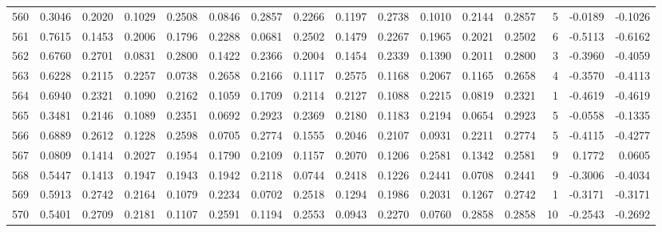 \begin{tabular}{lrrrrrrrrrrrrrrr}
560 &      0.3046 &  0.2020 &  0.1029 &  0.2508 &  0.0846 &  0.2857 &  0.2266 &  0.1197 &  0.2738 &  0.1010 &   0.2144 &     0.2857 &      5 &                   -0.0189 &                    -0.1026 \\
561 &      0.7615 &  0.1453 &  0.2006 &  0.1796 &  0.2288 &  0.0681 &  0.2502 &  0.1479 &  0.2267 &  0.1965 &   0.2021 &     0.2502 &      6 &                   -0.5113 &                    -0.6162 \\
562 &      0.6760 &  0.2701 &  0.0831 &  0.2800 &  0.1422 &  0.2366 &  0.2004 &  0.1454 &  0.2339 &  0.1390 &   0.2011 &     0.2800 &      3 &                   -0.3960 &                    -0.4059 \\
563 &      0.6228 &  0.2115 &  0.2257 &  0.0738 &  0.2658 &  0.2166 &  0.1117 &  0.2575 &  0.1168 &  0.2067 &   0.1165 &     0.2658 &      4 &                   -0.3570 &                    -0.4113 \\
564 &      0.6940 &  0.2321 &  0.1090 &  0.2162 &  0.1059 &  0.1709 &  0.2114 &  0.2127 &  0.1088 &  0.2215 &   0.0819 &     0.2321 &      1 &                   -0.4619 &                    -0.4619 \\
565 &      0.3481 &  0.2146 &  0.1089 &  0.2351 &  0.0692 &  0.2923 &  0.2369 &  0.2180 &  0.1183 &  0.2194 &   0.0654 &     0.2923 &      5 &                   -0.0558 &                    -0.1335 \\
566 &      0.6889 &  0.2612 &  0.1228 &  0.2598 &  0.0705 &  0.2774 &  0.1555 &  0.2046 &  0.2107 &  0.0931 &   0.2211 &     0.2774 &      5 &                   -0.4115 &                    -0.4277 \\
567 &      0.0809 &  0.1414 &  0.2027 &  0.1954 &  0.1790 &  0.2109 &  0.1157 &  0.2070 &  0.1206 &  0.2581 &   0.1342 &     0.2581 &      9 &                    0.1772 &                     0.0605 \\
568 &      0.5447 &  0.1413 &  0.1947 &  0.1943 &  0.1942 &  0.2118 &  0.0744 &  0.2418 &  0.1226 &  0.2441 &   0.0708 &     0.2441 &      9 &                   -0.3006 &                    -0.4034 \\
569 &      0.5913 &  0.2742 &  0.2164 &  0.1079 &  0.2234 &  0.0702 &  0.2518 &  0.1294 &  0.1986 &  0.2031 &   0.1267 &     0.2742 &      1 &                   -0.3171 &                    -0.3171 \\
570 &      0.5401 &  0.2709 &  0.2181 &  0.1107 &  0.2591 &  0.1194 &  0.2553 &  0.0943 &  0.2270 &  0.0760 &   0.2858 &     0.2858 &     10 &                   -0.2543 &                    -0.2692 \\

\end{tabular}
